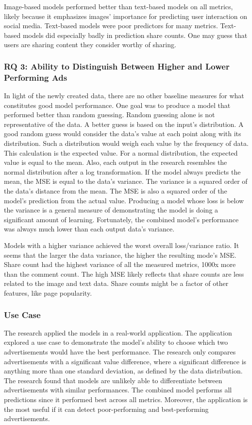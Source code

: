 \documentclass[mksc,blindrev]{informs3} %
\begin{document}
Image-based models performed better than text-based models on all metrics, likely because it emphasizes images' importance for predicting user interaction on social media. Text-based models were poor predictors for many metrics. Text-based models did especially badly in prediction share counts. One may guess that users are sharing content they consider worthy of sharing. 

\subsubsection{RQ 3: Ability to Distinguish Between Higher and Lower Performing Ads}
In light of the newly created data, there are no other baseline measures for what constitutes good model performance. One goal was to produce a model that performed better than random guessing. Random guessing alone is not representative of the data. A better guess is based on the input's distribution. A good random guess would consider the data's value at each point along with its distribution. Such a distribution would weigh each value by the frequency of data. This calculation is the expected value. For a normal distribution, the expected value is equal to the mean. Also, each output in the research resembles the normal distribution after a log transformation. If the model always predicts the mean, the MSE is equal to the data's variance. The variance is a squared order of the data's distance from the mean. The MSE is also a squared order of the model's prediction from the actual value. Producing a model whose loss is below the variance is a general measure of demonstrating the model is doing a significant amount of learning. Fortunately, the combined model's performance was always much lower than each output data's variance.

Models with a higher variance achieved the worst overall loss/variance ratio.  It seems that the larger the data variance, the higher the resulting mode's MSE.  Share count had the highest variance of all the measured metrics, 1000x more than the comment count.  The high MSE likely reflects that share counts are less related to the image and text data. Share counts might be a factor of other features, like page popularity.

\subsubsection{Use Case}
The research applied the models in a real-world application. The application explored a use case to demonstrate the model's ability to choose which two advertisements would have the best performance. The research only compares advertisements with a significant value difference, where a significant difference is anything more than one standard deviation, as defined by the data distribution. The research found that models are unlikely able to differentiate between advertisements with similar performances. The combined model performs all predictions since it performed best across all metrics. Moreover, the application is the most useful if it can detect poor-performing and best-performing advertisements.  
\end{document}
